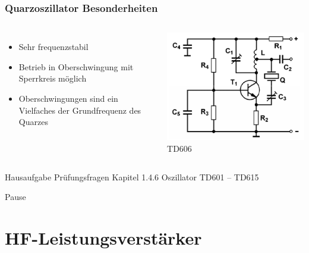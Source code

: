 \begin{frame}
  \frametitle{Quarzoszillator Besonderheiten}
  \begin{columns}
    \begin{itemize}
      \item Sehr frequenzstabil
      \item Betrieb in Oberschwingung mit Sperrkreis möglich
      \item Oberschwingungen sind ein Vielfaches der Grundfrequenz des Quarzes
    \end{itemize}    
    \includegraphics[width=\textwidth,height=.8\textheight,keepaspectratio]{a07/TD606_quarz_Oberschwingung.png}\\
    {\tiny TD606 \hyperlink{refs}{\cite{bna}}}
  \end{columns}
\end{frame}

\begin{frame}
  \begin{exampleblock}{Hausaufgabe}
    Prüfungsfragen Kapitel 1.4.6 Oszillator TD601 -- TD615
  \end{exampleblock}
\end{frame}

\begin{frame}
  \begin{center}
    \Huge Pause
  \end{center}
\end{frame}

\section*{HF-Leistungs\-verstärker}

